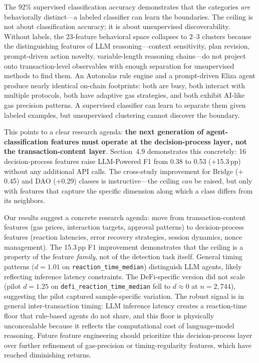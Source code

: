 \documentclass[sigconf,nonacm=false]{acmart}
\begin{document}
The 92\% supervised classification accuracy demonstrates that the categories \emph{are} behaviorally distinct---a labeled classifier can learn the boundaries. The ceiling is not about classification accuracy; it is about unsupervised discoverability. Without labels, the 23-feature behavioral space collapses to 2--3 clusters because the distinguishing features of LLM reasoning---context sensitivity, plan revision, prompt-driven action novelty, variable-length reasoning chains---do not project onto transaction-level observables with enough separation for unsupervised methods to find them. An Autonolas rule engine and a prompt-driven Eliza agent produce nearly identical on-chain footprints: both are busy, both interact with multiple protocols, both have adaptive gas strategies, and both exhibit AI-like gas precision patterns. A supervised classifier can learn to separate them given labeled examples, but unsupervised clustering cannot discover the boundary.

This points to a clear research agenda: \textbf{the next generation of agent-classification features must operate at the decision-process layer, not the transaction-content layer}. Section~4.9 demonstrates this concretely: 16 decision-process features raise LLM-Powered F1 from 0.38 to 0.53 ($+$15.3\,pp) without any additional API calls. The cross-study improvement for Bridge ($+$0.45) and DAO ($+$0.29) classes is instructive---the ceiling \emph{can} be raised, but only with features that capture the specific dimension along which a class differs from its neighbors.

Our results suggest a concrete research agenda: move from transaction-content features (gas prices, interaction targets, approval patterns) to decision-process features (reaction latencies, error recovery strategies, session dynamics, nonce management). The 15.3\,pp F1 improvement demonstrates that the ceiling is a property of the feature \emph{family}, not of the detection task itself. General timing patterns ($d{=}1.01$ on \texttt{reaction\_time\_median}) distinguish LLM agents, likely reflecting inference latency constraints. The DeFi-specific version did not scale (pilot $d{=}1.25$ on \texttt{defi\_reaction\_time\_median} fell to $d{\approx}0$ at $n{=}2{,}744$), suggesting the pilot captured sample-specific variation. The robust signal is in general inter-transaction timing: LLM inference latency creates a reaction-time floor that rule-based agents do not share, and this floor is physically unconcealable because it reflects the computational cost of language-model reasoning. Future feature engineering should prioritize this decision-process layer over further refinement of gas-precision or timing-regularity features, which have reached diminishing returns.
\end{document}
